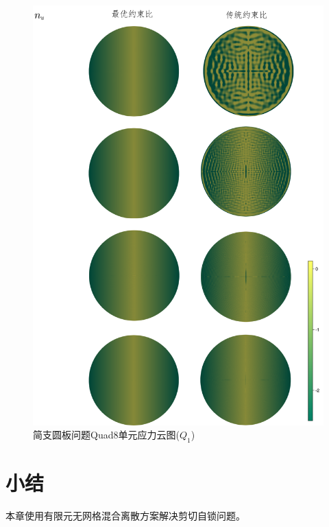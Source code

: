 \begin{figure}[!h]
    \centering 
        \includegraphics[scale=0.6]{figures/shearlocking/Circular_quad8_q1.png}
        \caption{简支圆板问题Quad8单元应力云图($Q_1$)}\label{ch_5:fig:Circular_Q1_quad8}
\end{figure}

\section{小结}
本章使用有限元无网格混合离散方案解决剪切自锁问题。
